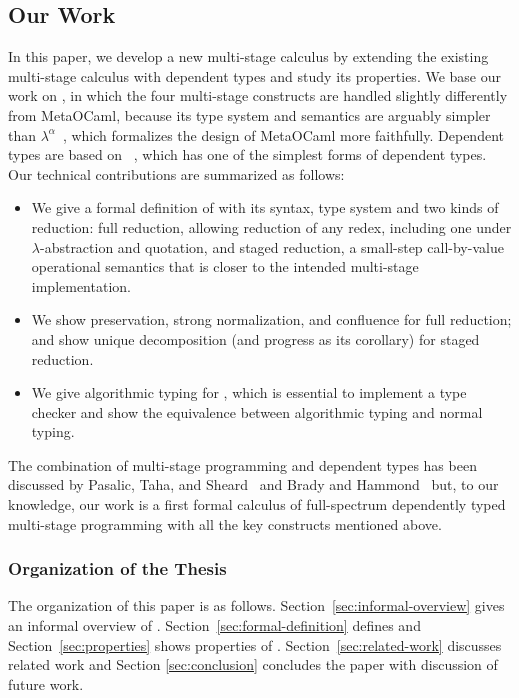\subsection{Our Work}
In this paper, we develop a new multi-stage calculus \LMD by extending the
existing multi-stage calculus \LTP\cite{Hanada2014} with dependent types and
study its properties.  We base our work on \LTP, in which the four multi-stage
constructs are handled slightly differently from MetaOCaml, because its type
system and semantics are arguably simpler than
\(\lambda^\alpha\)~\cite{taha2003environment}, which formalizes the design of
MetaOCaml more faithfully.  Dependent types are based on \LLF~\cite{attapl},
which has one of the simplest forms of dependent types.  Our technical
contributions are summarized as follows:
\begin{itemize}
    \item We give a formal definition of \LMD with its syntax, type system and
        two kinds of reduction: full reduction, allowing reduction of any redex,
        including one under $\lambda$-abstraction and quotation, and staged reduction, a
        small-step call-by-value operational semantics that is closer to the intended
        multi-stage implementation.
    \item We show preservation, strong normalization, and confluence for full
        reduction; and show unique decomposition (and progress as its
        corollary) for staged reduction.
    \item We give algorithmic typing for \LMD, which is essential to implement
        a type checker and show the equivalence between algorithmic typing and
        normal typing.
\end{itemize}
The combination of multi-stage programming and dependent types has been
discussed by Pasalic, Taha, and Sheard~\cite{pasalic2002tagless} and Brady and
Hammond~\cite{brady2006dependently} but, to our knowledge, our work is a first
formal calculus of full-spectrum dependently typed multi-stage programming with
all the key constructs mentioned above.

\subsubsection{Organization of the Thesis}

The organization of this paper is as follows.
Section~\ref{sec:informal-overview} gives an informal overview of
\LMD. Section~\ref{sec:formal-definition} defines \LMD and
Section~\ref{sec:properties} shows properties of \LMD.
Section~\ref{sec:related-work} discusses related work and Section
\ref{sec:conclusion} concludes the paper with discussion of future
work.
